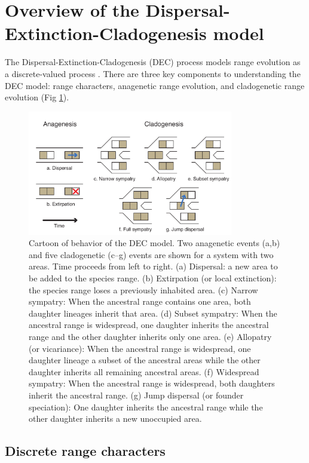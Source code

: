 \section{Overview of the Dispersal-Extinction-Cladogenesis model} \label{sec:bg_intro2}

The Dispersal-Extinction-Cladogenesis (DEC) process models range evolution as a discrete-valued process \citep{Ree2005, Ree2008}.
There are three key components to understanding the DEC model: range characters, anagenetic range evolution, and cladogenetic range evolution (Fig \ref{fig:dec_cartoon}).

\begin{figure}[!h]
\centering
\includegraphics[width=0.8\textwidth]{figures/fig_range_evol_events.pdf}
\caption{
Cartoon of behavior of the DEC model.
Two anagenetic events (a,b) and five cladogenetic (c--g) events are shown for a system with two areas.
Time proceeds from left to right.
(a) Dispersal: a new area to be added to the species range.
(b) Extirpation (or local extinction): the species range loses a previously inhabited area.
(c) Narrow sympatry: When the ancestral range contains one area, both daughter lineages inherit that area.
(d) Subset sympatry: When the ancestral range is widespread, one daughter inherits the ancestral range and the other daughter inherits only one area.
(e) Allopatry (or vicariance): When the ancestral range is widespread, one daughter lineage a subset of the ancestral areas while the other daughter inherits all remaining ancestral areas.
(f) Widespread sympatry: When the ancestral range is widespread, both daughters inherit the ancestral range.
(g) Jump dispersal (or founder speciation): One daughter inherits the ancestral range while the other daughter inherits a new unoccupied area.
}
\label{fig:dec_cartoon}
\end{figure}

\subsection*{Discrete range characters}


